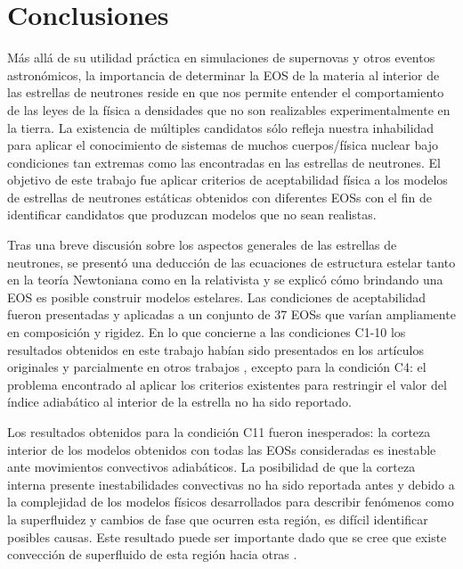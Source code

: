 \chapter{Conclusiones}
\noindent Más allá de su utilidad práctica en simulaciones de supernovas y otros eventos astronómicos, la importancia de determinar la EOS de la materia al interior de las estrellas de neutrones reside en que nos permite entender el comportamiento de las leyes de la física a densidades que no son realizables experimentalmente en la tierra. La existencia de múltiples candidatos sólo refleja nuestra inhabilidad para aplicar el conocimiento de sistemas de muchos cuerpos/física nuclear bajo condiciones tan extremas como las encontradas en las estrellas de neutrones. El objetivo de este trabajo fue aplicar criterios de aceptabilidad física a los modelos de estrellas de neutrones estáticas obtenidos con diferentes EOSs con el fin de identificar candidatos que produzcan modelos que no sean realistas. 

Tras una breve discusión sobre los aspectos generales de las estrellas de neutrones, se presentó una deducción de las ecuaciones de estructura estelar tanto en la teoría Newtoniana como en la relativista y se explicó cómo brindando una EOS es posible construir modelos estelares. Las condiciones de aceptabilidad fueron presentadas y aplicadas a un conjunto de 37 EOSs que varían ampliamente en composición y rigidez. En lo que concierne a las condiciones C1-10 los resultados obtenidos en este trabajo habían sido presentados en los artículos originales y parcialmente en otros trabajos \cite{Ozel2016,Read2009}, excepto para la condición C4: el problema encontrado al aplicar los criterios existentes para restringir el valor del índice adiabático al interior de la estrella no ha sido reportado. 

Los resultados obtenidos para la condición C11 fueron inesperados: la corteza interior de los modelos obtenidos con todas las EOSs consideradas es inestable ante movimientos convectivos adiabáticos. La posibilidad de que la corteza interna presente inestabilidades convectivas no ha sido reportada antes y debido a la complejidad de los modelos físicos desarrollados para describir fenómenos como la superfluidez y cambios de fase que ocurren esta región, es difícil identificar posibles causas. Este resultado puede ser importante dado que se cree que existe convección de superfluido de esta región hacia otras \cite{Haensel2007}. 

